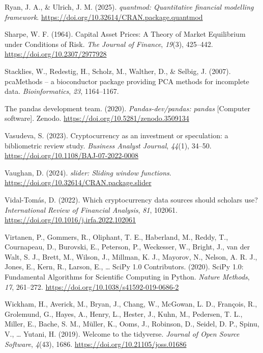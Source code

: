 \documentclass[
  12pt,
  a4paper,
  openany]{scrbook}
\newlength{\cslhangindent}
\newenvironment{CSLReferences}[2] %
 {\begin{list}{}{%
  \setlength{\itemindent}{0pt}
  \setlength{\leftmargin}{0pt}
  \setlength{\parsep}{0pt}
  \ifodd #1
   \setlength{\leftmargin}{\cslhangindent}
   \setlength{\itemindent}{-1\cslhangindent}
  \fi
  \setlength{\itemsep}{#2\baselineskip}}}
 {\end{list}}
\begin{document}
\begin{CSLReferences}{1}{0}
Ryan, J. A., \& Ulrich, J. M. (2025). \emph{{quantmod}: Quantitative
financial modelling framework}.
\url{https://doi.org/10.32614/CRAN.package.quantmod}

Sharpe, W. F. (1964). Capital Asset Prices: A Theory of Market
Equilibrium under Conditions of Risk. \emph{The Journal of Finance},
\emph{19}(3), 425--442. \url{https://doi.org/10.2307/2977928}

Stacklies, W., Redestig, H., Scholz, M., Walther, D., \& Selbig, J.
(2007). pcaMethods -- a bioconductor package providing PCA methods for
incomplete data. \emph{Bioinformatics}, \emph{23}, 1164--1167.

The pandas development team. (2020). \emph{Pandas-dev/pandas: pandas}
{[}Computer software{]}. Zenodo.
\url{https://doi.org/10.5281/zenodo.3509134}

Vasudeva, S. (2023). Cryptocurrency as an investment or speculation: a
bibliometric review study. \emph{Business Analyst Journal},
\emph{44}(1), 34--50. \url{https://doi.org/10.1108/BAJ-07-2022-0008}

Vaughan, D. (2024). \emph{{slider}: Sliding window functions}.
\url{https://doi.org/10.32614/CRAN.package.slider}

Vidal-Tomás, D. (2022). Which cryptocurrency data sources should
scholars use? \emph{International Review of Financial Analysis},
\emph{81}, 102061. \url{https://doi.org/10.1016/j.irfa.2022.102061}

Virtanen, P., Gommers, R., Oliphant, T. E., Haberland, M., Reddy, T.,
Cournapeau, D., Burovski, E., Peterson, P., Weckesser, W., Bright, J.,
van der Walt, S. J., Brett, M., Wilson, J., Millman, K. J., Mayorov, N.,
Nelson, A. R. J., Jones, E., Kern, R., Larson, E., \ldots{} SciPy 1.0
Contributors. (2020). {{SciPy} 1.0: Fundamental Algorithms for
Scientific Computing in Python}. \emph{Nature Methods}, \emph{17},
261--272. \url{https://doi.org/10.1038/s41592-019-0686-2}

Wickham, H., Averick, M., Bryan, J., Chang, W., McGowan, L. D.,
François, R., Grolemund, G., Hayes, A., Henry, L., Hester, J., Kuhn, M.,
Pedersen, T. L., Miller, E., Bache, S. M., Müller, K., Ooms, J.,
Robinson, D., Seidel, D. P., Spinu, V., \ldots{} Yutani, H. (2019).
Welcome to the {tidyverse}. \emph{Journal of Open Source Software},
\emph{4}(43), 1686. \url{https://doi.org/10.21105/joss.01686}


\end{CSLReferences}
\end{document}
